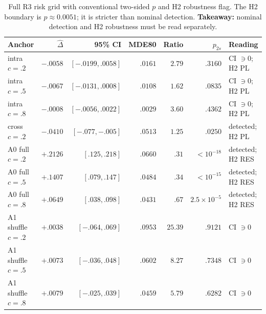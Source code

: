 \documentclass{article}
\begin{document}
\begin{table}[ht]
\caption{Full R3 risk grid with conventional two-sided $p$ and H2 robustness flag.  The H2
boundary is $p\approx0.0051$; it is stricter than nominal detection.  \textbf{Takeaway:}
nominal detection and H2 robustness must be read separately.}
\label{tab:r3full}
\centering\footnotesize
\setlength{\tabcolsep}{3pt}
\begin{tabular}{@{}lrrrrrl@{}}
\toprule
Anchor & $\hat\Delta$ & 95\% CI & MDE80 & Ratio & $p_{2s}$ & Reading \\
\midrule
intra $c=.2$ & $-.0058$ & $[-.0199,.0058]$ & $.0161$ & $2.79$ & $.3160$ & CI $\ni0$; H2 PL \\
intra $c=.5$ & $-.0067$ & $[-.0131,.0008]$ & $.0108$ & $1.62$ & $.0835$ & CI $\ni0$; H2 PL \\
intra $c=.8$ & $-.0008$ & $[-.0056,.0022]$ & $.0029$ & $3.60$ & $.4362$ & CI $\ni0$; H2 PL \\
cross $c=.2$ & $-.0410$ & $[-.077,-.005]$ & $.0513$ & $1.25$ & $.0250$ & detected; H2 PL \\
A0 full $c=.2$ & $+.2126$ & $[.125,.218]$ & $.0660$ & $.31$ & $<10^{-18}$ & detected; H2 RES \\
A0 full $c=.5$ & $+.1407$ & $[.079,.147]$ & $.0484$ & $.34$ & $<10^{-15}$ & detected; H2 RES \\
A0 full $c=.8$ & $+.0649$ & $[.038,.098]$ & $.0431$ & $.67$ & $2.5\!\times\!10^{-5}$ & detected; H2 RES \\
A1 shuffle $c=.2$ & $+.0038$ & $[-.064,.069]$ & $.0953$ & $25.39$ & $.9121$ & CI $\ni0$ \\
A1 shuffle $c=.5$ & $+.0073$ & $[-.036,.048]$ & $.0602$ & $8.27$ & $.7348$ & CI $\ni0$ \\
A1 shuffle $c=.8$ & $+.0079$ & $[-.025,.039]$ & $.0459$ & $5.79$ & $.6282$ & CI $\ni0$ \\
\bottomrule
\end{tabular}
\end{table}
\end{document}
